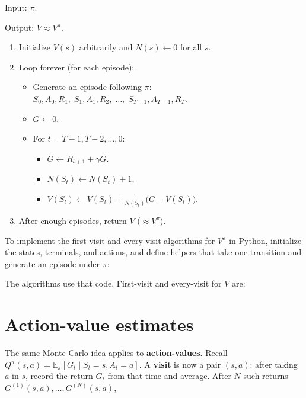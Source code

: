 \begin{implnote}
Input: $\pi$.

Output: $V\approx V^\pi$.

\begin{enumerate}
\item Initialize $V(s)$ arbitrarily and $N(s)\leftarrow 0$ for all $s$.
\item Loop forever (for each episode):
\begin{itemize}
\item Generate an episode following $\pi$:   $S_0,A_0,R_1,\;S_1,A_1,R_2,\;\ldots,\;S_{T-1},A_{T-1},R_T$.
\item $G\leftarrow 0$.
\item For $t=T{-}1,T{-}2,\ldots,0$:
\begin{itemize}
\item $G\leftarrow R_{t+1}+\gamma G$.
\item $N(S_t)\leftarrow N(S_t)+1$,
\item $V(S_t)\leftarrow V(S_t)+\frac{1}{N(S_t)}\bigl(G-V(S_t)\bigr)$.
\end{itemize}
\end{itemize}
\item After enough episodes, return $V$ ($\approx V^\pi$).
\end{enumerate}

\end{implnote}

To implement the first-visit and every-visit algorithms for $V^\pi$ in Python, initialize the states, terminals, and actions, and define helpers that take one transition and generate an episode under $\pi$:




The algorithms use that code. First-visit and every-visit for $V$ are:




\section{Action-value estimates}

The same Monte Carlo idea applies to \textbf{action-values}. Recall $Q^\pi(s,a)=\mathbb{E}_\pi[G_t\mid S_t=s,A_t=a]$. A \textbf{visit} is now a pair $(s,a)$: after taking $a$ in $s$, record the return $G_t$ from that time and average. After $N$ such returns $G^{(1)}(s,a),\ldots,G^{(N)}(s,a)$,

